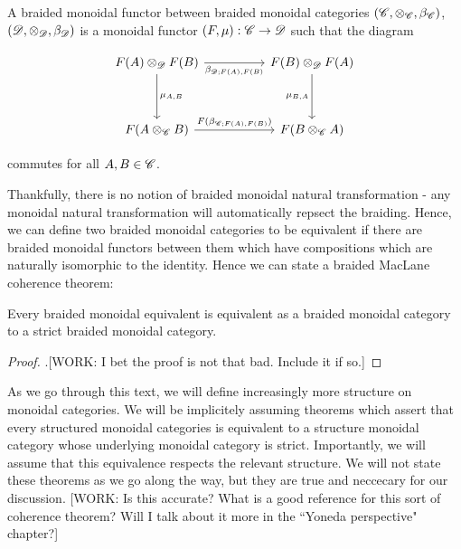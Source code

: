 \begin{definition} A braided monoidal functor between braided monoidal categories $(\mathscr{C},\otimes_{\mathscr{C}},\beta_{\mathscr{C}})$, $(\mathscr{D},\otimes_{\mathscr{D}},\beta_{\mathscr{D}})$ is a monoidal functor $(F,\mu):\mathscr{C}\to \mathscr{D}$ such that the diagram

\[\begin{tikzcd}
	{F(A)\otimes_{\Dcat}F(B)} && {F(B)\otimes_{\Dcat}F(A)} \\
	\\
	{F(A\otimes_{\C}B)} && {F(B\otimes_{\C}A)}
	\arrow["{\mu_{A,B}}", from=1-1, to=3-1]
	\arrow["{\beta_{\Dcat;F(A),F(B)}}"', from=1-1, to=1-3]
	\arrow["{\mu_{B,A}}"', from=1-3, to=3-3]
	\arrow["{F(\beta_{\C;F(A),F(B)})}", from=3-1, to=3-3]
\end{tikzcd}\]

commutes for all $A,B\in \mathscr{C}$.

\raggedleft\qedsymbol{}
\end{definition}

Thankfully, there is no notion of braided monoidal natural transformation - any monoidal natural transformation will automatically repsect the braiding. Hence, we can define two braided monoidal categories to be equivalent if there are braided monoidal functors between them which have compositions which are naturally isomorphic to the identity. Hence we can state a braided MacLane coherence theorem:

\begin{theorem} Every braided monoidal equivalent is equivalent as a braided monoidal category to a strict braided monoidal category.
\end{theorem}
\begin{proof}.[WORK: I bet the proof is not that bad. Include it if so.]
\end{proof}

As we go through this text, we will define increasingly more structure on monoidal categories. We will be implicitely assuming theorems which assert that every structured monoidal categories is equivalent to a structure monoidal category whose underlying monoidal category is strict. Importantly, we will assume that this equivalence respects the relevant structure. We will not state these theorems as we go along the way, but they are true and neccecary for our discussion. [WORK: Is this accurate? What is a good reference for this sort of coherence theorem? Will I talk about it more in the ``Yoneda perspective" chapter?]


